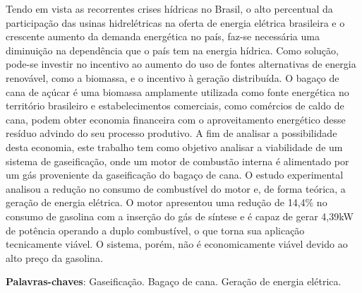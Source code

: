 \begin{resumo}

Tendo em vista as recorrentes crises hídricas no Brasil, o alto percentual da participação das usinas hidrelétricas na oferta de energia elétrica brasileira e o crescente aumento da demanda energética no país, faz-se necessária uma diminuição na dependência que o país tem na energia hídrica. Como solução, pode-se investir no incentivo ao aumento do uso de fontes alternativas de energia renovável, como a biomassa, e o incentivo à geração distribuída. O bagaço de cana de açúcar é uma biomassa amplamente utilizada como fonte energética no território brasileiro e estabelecimentos comerciais, como comércios de caldo de cana, podem obter economia financeira com o aproveitamento energético desse resíduo advindo do seu processo produtivo. A fim de analisar a possibilidade desta economia, este trabalho tem como objetivo analisar a viabilidade de um sistema de gaseificação, onde um motor de combustão interna é alimentado por um gás proveniente da gaseificação do bagaço de cana. O estudo experimental analisou a redução no consumo de combustível do motor e, de forma teórica, a geração de energia elétrica. O motor apresentou uma redução de 14,4\% no consumo de gasolina com a inserção do gás de síntese e é capaz de gerar 4,39kW de potência operando a duplo combustível, o que torna sua aplicação tecnicamente viável. O sistema, porém, não é economicamente viável devido ao alto preço da gasolina. 

 \vspace{\onelineskip}
    
 \noindent
 \textbf{Palavras-chaves}: Gaseificação. Bagaço de cana. Geração de energia elétrica.
\end{resumo}

